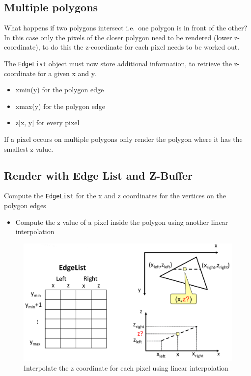 \documentclass[
]{book}
\providecommand{\tightlist}{%
  \setlength{\itemsep}{0pt}\setlength{\parskip}{0pt}}
\begin{document}
\hypertarget{multiple-polygons}{%
\subsection{Multiple polygons}\label{multiple-polygons}}

What happens if two polygons intersect i.e.~one polygon is in front of the other? In this case only the pixels of the closer polygon need to be rendered (lower z-coordinate), to do this the z-coordinate for each pixel needs to be worked out.

The \texttt{EdgeList} object must now store additional information, to retrieve the z-coordinate for a given x and y.

\begin{itemize}
\tightlist
\item
  xmin(y) for the polygon edge
\item
  xmax(y) for the polygon edge
\item
  z{[}x, y{]} for every pixel
\end{itemize}

If a pixel occurs on multiple polygons only render the polygon where it has the smallest z value.

\hypertarget{render-with-edge-list-and-z-buffer}{%
\subsection{Render with Edge List and Z-Buffer}\label{render-with-edge-list-and-z-buffer}}

Compute the \texttt{EdgeList} for the x and z coordinates for the vertices on the polygon edges

\begin{itemize}
\tightlist
\item
  Compute the z value of a pixel inside the polygon using another linear interpolation
\end{itemize}

\begin{figure}
\centering
\includegraphics{img/08-image35.png}
\caption{\label{fig:z-value}Interpolate the z coordinate for each pixel using linear interpolation}
\end{figure}
\end{document}

